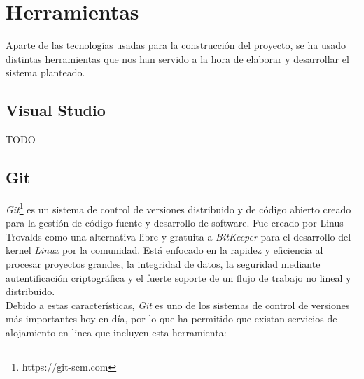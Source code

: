 \section{Herramientas}

Aparte de las tecnologías usadas para la construcción del proyecto, se ha usado distintas herramientas que nos han servido a la hora de elaborar y desarrollar el sistema planteado.

\subsection{Visual Studio}

TODO

\subsection{Git}

\textit{Git}\footnote{https://git-scm.com} es un sistema de control de versiones distribuido y de código abierto creado para la gestión de código fuente y desarrollo de software. Fue creado por Linus Trovalds como una alternativa libre y gratuita a \textit{BitKeeper} para el desarrollo del kernel \textit{Linux} por la comunidad. Está enfocado en la rapidez y eficiencia al procesar proyectos grandes, la integridad de datos, la seguridad mediante autentificación criptográfica y el fuerte soporte de un flujo de trabajo no lineal y distribuido. \\

Debido a estas características, \textit{Git} es uno de los sistemas de control de versiones más importantes hoy en día, por lo que ha permitido que existan servicios de alojamiento en linea que incluyen esta herramienta:

